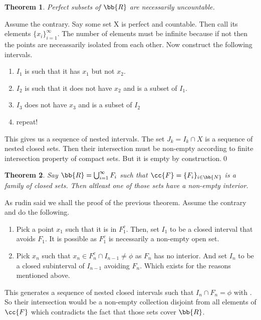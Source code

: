 \documentclass{myclass}
\newtheorem*{theorem}{Theorem}
\begin{document}
\begin{theorem}
    Perfect subsets of $\bb{R}$ are necessarily uncountable.
\end{theorem}
\begin{prf}
    Assume the contrary. Say some set X is perfect and countable. Then call its elements $\{x_i\}_{i=1}^\infty$. The number of elements must be infinite because if not 
    then the points are neceassarily isolated from each other. Now construct the following intervals.
    \begin{enumerate}
        \item $I_1$ is such that it has $x_1$ but not $x_2$.
        \item $I_2$ is such that it does not have $x_2$ and is a subset of $I_1$.
        \item $I_3$ does not have $x_3$ and is a subset of $I_2$
        \item repeat!
    \end{enumerate}
    This gives us a sequence of nested intervals. The set $J_k=I_k\cap X$ is a sequence of nested closed sets.
    Then their intersection must be non-empty according to finite intersection property of compact sets. But it is empty by construction.\qed
\end{prf}

\begin{theorem}
    Say $\bb{R}=\bigcup_{i=1}^\infty F_i$ such that $\cc{F}=\{F_i\}_{i\in\bb{N}}$ is a family of closed sets. Then altleast one of those sets have a non-empty interior. 
\end{theorem}
\begin{prf}
    As rudin said we shall  the proof of the previous theorem. Assume the contrary and do the following.
    \begin{enumerate}
        \item {} Pick a point $x_1$ such that it is in $F_1^c$. Then, set $I_1$ to be a closed interval that avoids $F_1$. It is possible as $F_1^c$ is necessarily a non-empty open set.
        \item {} Pick $x_n$ such that $x_n\in F_n^c\cap I_{n-1}\neq \phi$ as $F_n$ has no interior. And set $I_n$ to be a closed subinterval of $I_{n-1}$ avoiding $F_n$. Which exists for the reasons mentioned above. 
    \end{enumerate}
    This generates a sequence of nested closed intervals such that $I_n\cap F_n = \phi$ with .
    So their intersection would be a non-empty collection disjoint from all elements of $\cc{F}$ which contradicts the fact that those sets cover $\bb{R}$.
\end{prf}
\end{document}

